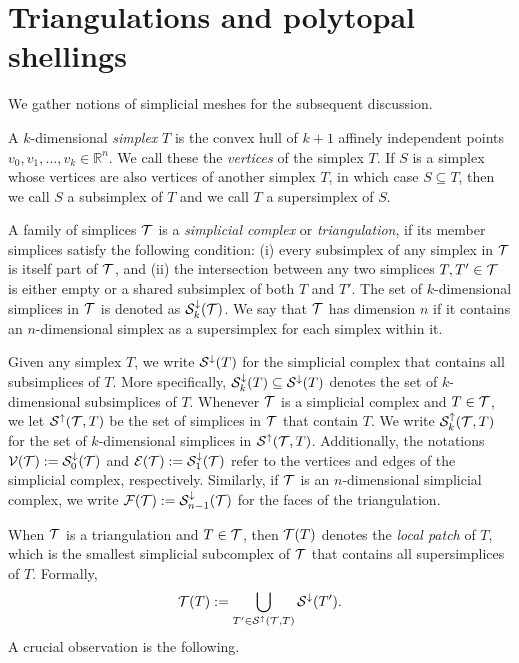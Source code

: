 \documentclass[a4paper]{article}
\begin{document}
\section{Triangulations and polytopal shellings}


We gather notions of simplicial meshes for the subsequent discussion. 

A ${k}$-dimensional \emph{simplex} $T$ is the convex hull of ${k}+1$ affinely independent points $v_0, v_1, \ldots, v_{{k}} \in \mathbb{R}^{n}$. We call these the \emph{vertices} of the simplex $T$. 
If $S$ is a simplex whose vertices are also vertices of another simplex $T$, in which case $S \subseteq T$, 
then we call $S$ a subsimplex of $T$ and we call $T$ a supersimplex of $S$. 

A family of simplices ${\mathcal T}$ is a \emph{simplicial complex} or \emph{triangulation}, if its member simplices satisfy the following condition: 
(i) every subsimplex of any simplex in ${\mathcal T}$ is itself part of ${\mathcal T}$, and (ii) the intersection between any two simplices $T, T' \in {\mathcal T}$ is either empty or a shared subsimplex of both $T$ and $T'$. 
The set of $k$-dimensional simplices in ${\mathcal T}$ is denoted as ${\mathcal S}^{\downarrow}_{{k}}({\mathcal T})$. 
We say that ${\mathcal T}$ has dimension $n$ if it contains an $n$-dimensional simplex as a supersimplex for each simplex within it. 

Given any simplex $T$, we write ${\mathcal S}^{\downarrow}(T)$ for the simplicial complex that contains all subsimplices of $T$. 
More specifically, ${\mathcal S}^{\downarrow}_{{k}}(T) \subseteq {\mathcal S}^{\downarrow}(T)$ denotes the set of $k$-dimensional subsimplices of $T$. 
Whenever ${\mathcal T}$ is a simplicial complex and $T \in {\mathcal T}$, we let ${\mathcal S}^{\uparrow}({\mathcal T},T)$ be the set of simplices in ${\mathcal T}$ that contain $T$.
We write ${\mathcal S}^{\uparrow}_{k}({\mathcal T},T)$ for the set of $k$-dimensional simplices in ${\mathcal S}^{\uparrow}({\mathcal T},T)$. 
Additionally, the notations ${\mathcal V}({\mathcal T}) := {\mathcal S}^{\downarrow}_{0}({\mathcal T})$ and ${\mathcal E}({\mathcal T}) := {\mathcal S}^{\downarrow}_{1}({\mathcal T})$ refer to the vertices and edges of the simplicial complex, respectively. Similarly, if ${\mathcal T}$ is an $n$-dimensional simplicial complex, we write ${\mathcal F}({\mathcal T}) := {\mathcal S}^{\downarrow}_{n-1}({\mathcal T})$ for the faces of the triangulation. 

When ${\mathcal T}$ is a triangulation and $T \in {\mathcal T}$, then ${\mathcal T}(T)$ denotes the \emph{local patch} of $T$, which is the smallest simplicial subcomplex of ${\mathcal T}$ that contains all supersimplices of $T$. Formally,
\begin{gather*}
    {\mathcal T}(T) := \bigcup_{ T' \in {\mathcal S}^{\uparrow}({\mathcal T},T) } {\mathcal S}^{\downarrow}(T').
\end{gather*}
A crucial observation is the following.
\end{document}

